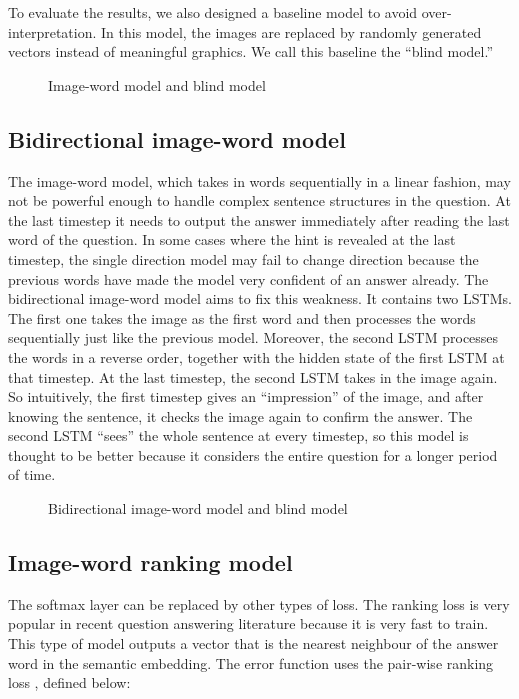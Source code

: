 To evaluate the results, we also designed a baseline model to avoid over-interpretation. In this model, the images are replaced by randomly generated vectors instead of meaningful graphics. We call this baseline the ``blind model.''

\begin{figure}
\centering
\scalebox{0.9}{
}
\caption{Image-word model and blind model}
\label{fig:imgword}
\end{figure}

\subsection{Bidirectional image-word model}
The image-word model, which takes in words sequentially in a linear fashion, may not be powerful enough to handle complex sentence structures in the question. At the last timestep it needs to output the answer immediately after reading the last word of the question. In some cases where the hint is revealed at the last timestep, the single direction model may fail to change direction because the previous words have made the model very confident of an answer already. The bidirectional image-word model aims to fix this weakness. It contains two LSTMs. The first one takes the image as the first word and then processes the words sequentially just like the previous model. Moreover, the second LSTM processes the words in a reverse order, together with the hidden state of the first LSTM at that timestep. At the last timestep, the second LSTM takes in the image again. So intuitively, the first timestep gives an ``impression'' of the image, and after knowing the sentence, it checks the image again to confirm the answer. The second LSTM ``sees'' the whole sentence at every timestep, so this model is thought to be better because it considers the entire question for a longer period of time.

\begin{figure}[h]
\centering
\scalebox{0.9}{
}
\caption{Bidirectional image-word model and blind model}
\label{fig:imgword}
\end{figure}

\subsection{Image-word ranking model}
The softmax layer can be replaced by other types of loss. The ranking loss is very popular in recent question answering literature because it is very fast to train. This type of model outputs a vector that is the nearest neighbour of the answer word in the semantic embedding. The error function uses the pair-wise ranking loss \cite{weston10}, defined below:


